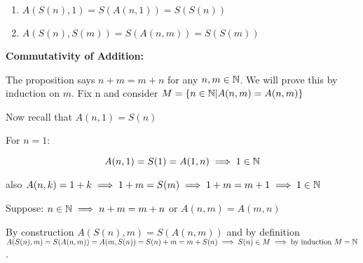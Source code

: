 \begin{enumerate}

	\item \(A(S(n), 1) = S(A(n, 1)) = S(S(n))\)

	\item \(A(S(n), S(m)) = S(A(n, m)) = S(S(m))\)

\end{enumerate}

\textbf{Commutativity of Addition:}

The proposition says \(n + m = m + n\) for any \(n, m \in \mathbb{N}\). We will prove this by 
induction on \(m\). Fix n and consider \(M = \{ n \in \mathbb{N} | A(n, m) = A(n, m)\}\)

Now recall that \(A(n, 1) = S(n)\)

For \(n = 1\):

\[
	A(n, 1) = S(1) = A(1, n) \implies 1 \in \mathbb{N}
\]

also \(A(n , k) = 1 + k \implies 1 + m = S(m) \implies 1 + m = m + 1 \implies 1 \in \mathbb{N}\)

Suppose: \(n \in \mathbb{N} \implies n + m = m + n\) or \(A(n, m) = A(m, n)\)

By construction \(A(S(n), m) = S(A(n, m))\) and by definition
\(A(S(n), m) = S(A(n, m)) = A(m, S(n)) = S(n) + m =  m + S(n) \implies S(n) \in M \implies 
\text{by induction } M = \mathbb{N}\).
